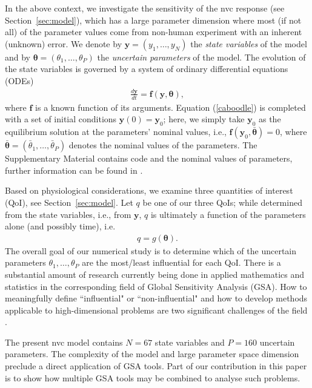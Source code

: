 \documentclass[smallextended]{svjour3}
\numberwithin{equation}{section}
\begin{document}
In the above context, we investigate the sensitivity of  the \gls{nvc} response (see Section~\ref{sec:model}), which has a large parameter dimension where most (if not all) of the parameter values come from non-human experiment  with an inherent (unknown) error. We denote by $\mathbf y = (y_1, \dots, y_N)$  the {\sl state variables} of the model and by $\boldsymbol{\theta} = (\theta_1, \dots, \theta_P)$ the {\sl uncertain parameters} of the model. The evolution of the state variables is governed by a system of ordinary differential equations (ODEs) 
\begin{eqnarray}
\frac {d\boldsymbol{y}}{dt} = \mathbf{f}(\mathbf{y}, \boldsymbol{\theta}), \label{caboodle}
\end{eqnarray}
where $\mathbf{f}$ is a known function of its arguments. Equation (\ref{caboodle}) is completed with a set of initial conditions $\boldsymbol{y}(0) = \boldsymbol{y}_0$;  here, we simply take $\boldsymbol{y}_0$ as the  equilibrium solution at the parameters' nominal values, i.e., $\mathbf f(  \mathbf{y}_0, \bar{\boldsymbol{\theta}}) = 0$, where $ \bar{\boldsymbol{\theta}} = (\bar\theta_1, \dots, \bar\theta_P)$ denotes the nominal values of the parameters. The Supplementary Material contains code and the nominal values of parameters, further information can be found in \cite{Dormanns2015a}.

Based on physiological considerations, we examine three quantities of interest (QoI), see Section~\ref{sec:model}.  Let $q$ be one of our three  QoIs; while determined from the state variables, i.e., from $\mathbf y$, $q$ is  ultimately a function of the parameters alone (and possibly time), i.e.
\begin{eqnarray}
q = g(\boldsymbol{\theta}). \label{qoi}
\end{eqnarray}
The overall goal of our numerical study is to determine  which of the uncertain parameters $\theta_1, \dots, \theta_P$  are the most/least influential for each QoI. There is a substantial amount of research currently being done in applied mathematics and statistics in the corresponding field of Global Sensitivity Analysis  (GSA). How to meaningfully define ``influential" or ``non-influential" and  how to develop methods applicable to high-dimensional problems are two significant challenges of the field \cite{corvar,timegsa,stogsa,iooss,owen,saltelli}. 



The present \gls{nvc} model contains $N=67$ state variables and $P= 160$ uncertain parameters. The complexity of the model and large parameter space dimension preclude a direct application of GSA tools. Part of our contribution in this paper is to show how multiple GSA tools may be combined to analyse such problems.
\end{document}
